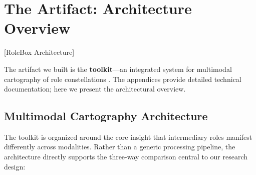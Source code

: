 \documentclass[../main.tex]{subfiles}
\begin{document}
\section{The \RoleBox Artifact: Architecture Overview}[RoleBox Architecture]

The artifact we built is the \textbf{\RoleBox toolkit}---an integrated system for multimodal cartography of role constellations \cite{gregor2013positioning}. The appendices provide detailed technical documentation; here we present the architectural overview.

\subsection{Multimodal Cartography Architecture}

The \RoleBox toolkit is organized around the core insight that intermediary roles manifest differently across modalities. Rather than a generic processing pipeline, the architecture directly supports the three-way comparison central to our research design:
\end{document}
